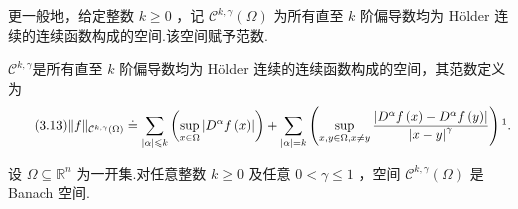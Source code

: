 更一般地，给定整数 $k \geq  0$ ，记 ${\mathcal{C}}^{k,\gamma }\left( \Omega \right)$ 为所有直至 $k$ 阶偏导数均为 Hölder 连续的连续函数构成的空间.该空间赋予范数.

\begin{definition}
    $\mathcal{C}^{k,\gamma}$是所有直至 $k$ 阶偏导数均为 Hölder 连续的连续函数构成的空间，其范数定义为
    \begin{equation}\tag{3.13}\label{eq:holder-norm-k-gamma}
\| f{\| }_{{\mathcal{C}}^{k,\gamma }\left( \Omega \right) } \doteq  \mathop{\sum }\limits_{{\left| \alpha \right|  \leq  k}}\left( {\mathop{\sup }\limits_{{x \in  \Omega }}\left| {{D}^{\alpha }f\left( x\right) }\right| }\right)  + \mathop{\sum }\limits_{{\left| \alpha \right|  = k}}\left( {\mathop{\sup }\limits_{{x,y \in  \Omega ,x \neq  y}}\frac{\left| {D}^{\alpha }f\left( x\right)  - {D}^{\alpha }f\left( y\right) \right| }{{\left| x - y\right| }^{\gamma }}}\right)\footnotemark.
\end{equation}
\end{definition}



\begin{theorem}\label{thm:holder-banach}
设 $\Omega  \subseteq  {\mathbb{R}}^{n}$ 为一开集.对任意整数 $k \geq  0$ 及任意 $0 < \gamma  \leq  1$ ，空间 ${\mathcal{C}}^{k,\gamma }\left( \Omega \right)$ 是 Banach 空间.
\end{theorem}

